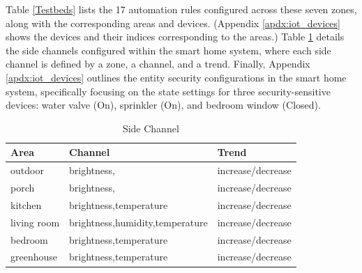 Table \ref{Testbeds} lists the 17 automation rules configured across these seven zones, along with the corresponding areas and devices. (Appendix \ref{apdx:iot_devices} shows the devices and their indices corresponding to the areas.) Table \ref{side_channel} details the side channels configured within the smart home system, where each side channel is defined by a zone, a channel, and a trend. Finally, Appendix \ref{apdx:iot_devices} outlines the entity security configurations in the smart home system, specifically focusing on the state settings for three security-sensitive devices: water valve (On), sprinkler (On), and bedroom window (Closed).

\begin{table}[htbp]
	\caption{Side Channel}
	\label{side_channel}
	\begin{tabular}[width=0.45\textwidth]{l|l|l}
		\hline
		\textbf{Area} & \textbf{Channel} & \textbf{Trend} \\
		\hline
		outdoor& brightness, & increase/decrease \\
		\hline
		porch& brightness, & increase/decrease \\
		\hline
		kitchen& brightness,temperature & increase/decrease \\
		\hline
		living room & brightness,humidity,temperature & increase/decrease \\
		\hline
		bedroom & brightness,temperature & increase/decrease \\
		\hline
		greenhouse & brightness,temperature & increase/decrease \\
		\hline
	\end{tabular}
\end{table}


